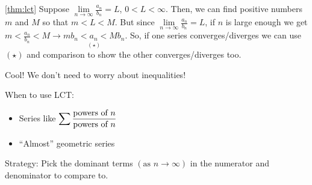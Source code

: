 \begin{Proof}{\ref{thm:lct}}{}
    Suppose $ \displaystyle \lim\limits_{{n} \to {\infty}} \frac{a_n}{b_n} =L $, $ 0<L<\infty $. Then,
    we can find positive numbers $ m $ and $ M $ so that $ m<L<M $. But since
    $ \displaystyle \lim\limits_{{n} \to {\infty}} \frac{a_n}{b_n} =L $, if $ n $ is large
    enough we get $ \displaystyle  m<\frac{a_n}{b_n} < M \rightarrow \underset{(\star)}{\boxed{mb_n<a_n<Mb_n}} $.
    So, if one series converges/diverges we can use $ (\star) $ and comparison
    to show the other converges/diverges too.
\end{Proof}

Cool! We don't need to worry about inequalities!

\begin{Remark}{}{}
    When to use LCT\@:
    \begin{itemize}
        \item Series like $ \displaystyle \sum \frac{\text{powers of $ n $}}{\text{powers of $ n $}} $
        \item ``Almost'' geometric series
    \end{itemize}
    Strategy: Pick the dominant terms $ \left( \text{as } n\rightarrow \infty \right) $
    in the numerator and denominator to compare to.
\end{Remark}

